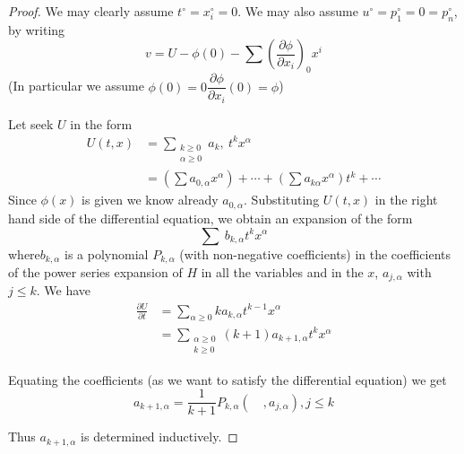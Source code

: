 \begin{proof}
We may clearly assume $t^{\circ}=x^{\circ}_{i}=0$. We may also assume $u^{\circ}=p^{\circ}_{1}=0=p^{\circ}_{n}$, by writing
$$
v=U-\phi (0)-\sum \left(\frac{\partial \phi}{\partial x_{i}}\right)_{0}x^{i}
$$
(In particular we assume $\phi(0)=0\dfrac{\partial \phi}{\partial x_{i}}(0)=\phi$)

Let seek $U$ in the form
\begin{align*}
U(t,x) &= \sum\limits_{\substack{k\geq 0\\ \alpha\geq 0}}a_{k}, \ t^{k}x^{\alpha}\\[3pt]
&= \left(\sum a_{0,\alpha}x^{\alpha}\right)+\cdots+\left(\sum a_{k\alpha}x^{\alpha}\right)t^{k}+\cdots
\end{align*}
Since $\phi(x)$ is given we know already $a_{0,\alpha}$. Substituting $U(t,x)$ in the right hand side of the differential equation, we obtain an expansion of the form
$$
\sum \ b_{k,\alpha} t^{k}x^{\alpha}
$$
where\pageoriginale $b_{k,\alpha}$ is a polynomial $P_{k,\alpha}$ (with non-negative coefficients) in the coefficients of the power series expansion of $H$ in all the variables and in the $x$, $a_{j,\alpha}$ with $j\leq k$. We have
\begin{align*}
\frac{\partial U}{\partial t} &= \sum\limits_{\alpha\geq 0}ka_{k,\alpha}t^{k-1}x^{\alpha}\\[3pt]
&= \sum\limits_{\substack{\alpha \geq 0\\ k\geq 0}}(k+1)a_{k+1,\alpha}t^{k}x^{\alpha}
\end{align*}

Equating the coefficients (as we want to satisfy the differential equation) we get 
$$
a_{k+1,\alpha}=\frac{1}{k+1}P_{k,\alpha}(\quad , a_{j,\alpha}),j\leq k
$$

Thus $a_{k+1,\alpha}$ is determined inductively.


\end{proof}
